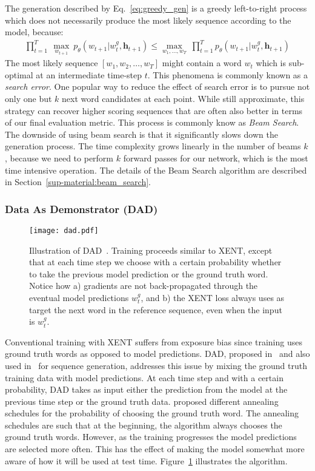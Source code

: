 \documentclass{article} \usepackage{iclr2016_conference,times}
\newcommand{\bh}{\mathbf{h}}
\begin{document}
The generation described by Eq.~\eqref{eq:greedy_gen} is
a greedy left-to-right process which does not necessarily produce
the most likely sequence according to the model, because:
\begin{align*}
    \prod_{t=1}^T ~\max_{w_{t+1}}~p_{\theta}(w_{t+1} | w^g_t, \bh_{t+1}) \leq
    \max_{w_1, \dots, w_T}~\prod_{t=1}^Tp_{\theta}(w_{t+1} | w^g_t, \bh_{t+1})
\end{align*}
The most likely sequence $[w_1, w_2, \dots, w_T]$ might contain a word  $w_t$ which is sub-optimal at an intermediate time-step $t$. This phenomena is commonly known as a {\it search error}. 
One popular way to reduce the effect of search error is to pursue not only one but $k$ next word 
candidates at each point. While still approximate, this strategy can recover 
higher scoring sequences that are often also better in terms of our final evaluation metric.
This process is commonly know as {\it Beam Search}. The downside of using beam search is that it significantly slows down 
the generation process. The time complexity 
grows linearly in the number of beams $k$, because we need to perform 
$k$ forward passes for our network, which is the most time intensive operation. 
The details of the 
Beam Search algorithm are described in Section~\ref{sup-material:beam_search}.




\subsubsection{Data As Demonstrator (DAD)} \label{model-dad}
\begin{figure}[!t]
\begin{center}
\texttt{[image: dad.pdf]}
\end{center}
\caption{Illustration of DAD~\citep{sbengio-nips2015,
    dad}. Training
  proceeds similar to XENT, except that at each time step we choose with
  a certain probability whether to take the previous model prediction or
  the ground truth word. Notice how a) gradients are not
  back-propagated through the eventual model predictions $w^g_t$, and
  b) the XENT loss always uses as target the next word in the reference
  sequence, even when the input is $w^g_t$.}
\label{fig:dad}
\end{figure}
Conventional training with XENT suffers from exposure bias since  
training uses ground truth words as opposed to model predictions.
DAD, proposed in~\citep{dad} and also used in~\citep{sbengio-nips2015} for sequence generation, addresses this issue by mixing the ground truth training data with model predictions.
At each time step and with a certain probability, DAD takes as input either the prediction from the model at the previous time step or the ground truth data. \citet{sbengio-nips2015} proposed  different 
annealing schedules for the probability of choosing the ground truth word. The annealing schedules are such that at the beginning, the algorithm always chooses the ground truth words. However, as the training progresses the model predictions are selected more often. 
This has the effect of making the model somewhat more aware of how it will be used at test time. Figure~\ref{fig:dad} illustrates the algorithm. 
\end{document}
